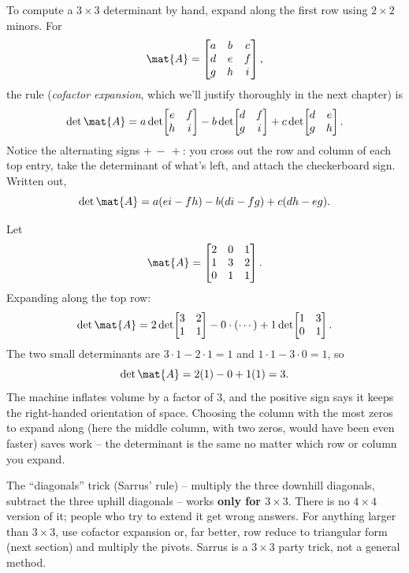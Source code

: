 To compute a $3\times 3$ determinant by hand, expand along the first row using
$2\times 2$ minors. For
\[
  \mat{A} = \begin{bmatrix} a & b & c \\ d & e & f \\ g & h & i \end{bmatrix},
\]
the rule (\emph{cofactor expansion}, which we'll justify thoroughly in the next
chapter) is
\[
  \det\mat{A}
  = a\det\!\begin{bmatrix} e & f \\ h & i \end{bmatrix}
  - b\det\!\begin{bmatrix} d & f \\ g & i \end{bmatrix}
  + c\det\!\begin{bmatrix} d & e \\ g & h \end{bmatrix}.
\]
Notice the alternating signs $+\,-\,+$: you cross out the row and column of each
top entry, take the determinant of what's left, and attach the checkerboard sign.
Written out,
\[
  \det\mat{A} = a(ei - fh) - b(di - fg) + c(dh - eg).
\]

\begin{example}
\label{ch21:ex-3x3}
Let
\[
  \mat{A} = \begin{bmatrix} 2 & 0 & 1 \\ 1 & 3 & 2 \\ 0 & 1 & 1 \end{bmatrix}.
\]
Expanding along the top row:
\[
  \det\mat{A}
  = 2\det\!\begin{bmatrix} 3 & 2 \\ 1 & 1 \end{bmatrix}
  - 0\cdot(\cdots)
  + 1\det\!\begin{bmatrix} 1 & 3 \\ 0 & 1 \end{bmatrix}.
\]
The two small determinants are $3\cdot1 - 2\cdot1 = 1$ and
$1\cdot1 - 3\cdot0 = 1$, so
\[
  \det\mat{A} = 2(1) - 0 + 1(1) = 3.
\]
The machine inflates volume by a factor of $3$, and the positive sign says it keeps
the right-handed orientation of space. Choosing the column with the most zeros to
expand along (here the middle column, with two zeros, would have been even faster)
saves work -- the determinant is the same no matter which row or column you expand.
\end{example}

\begin{trapbox}
The ``diagonals'' trick (Sarrus' rule) -- multiply the three downhill diagonals,
subtract the three uphill diagonals -- works \textbf{only for $3\times 3$}. There
is no $4\times 4$ version of it; people who try to extend it get wrong answers. For
anything larger than $3\times 3$, use cofactor expansion or, far better, row reduce
to triangular form (next section) and multiply the pivots. Sarrus is a $3\times 3$
party trick, not a general method.
\end{trapbox}

